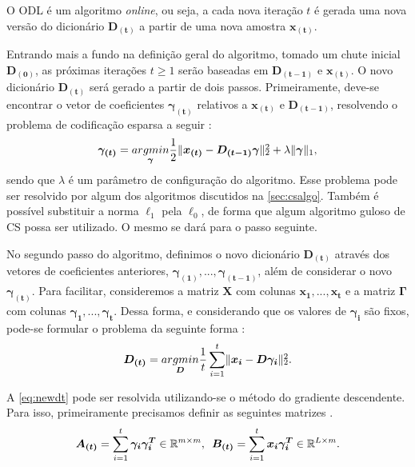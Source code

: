 \documentclass[cic,tc]{iiufrgs}
\def\SPSB#1#2{\rlap{\textsuperscript{#1}}\SB{#2}}
\def\SB#1{\textsubscript{#1}}
\renewcommand{\vec}[1]{\bm{#1}}
\newcommand{\mat}[1]{\bm{#1}}
\begin{document}
O ODL é um algoritmo \textit{online}, ou seja, a cada nova iteração $t$
é gerada uma nova versão do dicionário $\mat{D_{(t)}}$ a partir de uma nova amostra $\vec{x_{(t)}}$.

Entrando mais a fundo na definição geral do algoritmo, tomado um chute inicial $\mat{D_{(0)}}$, as próximas
iterações $t \ge 1$ serão baseadas em $\mat{D_{(t-1)}}$ e $\vec{x_{(t)}}$. O novo dicionário $\mat{D_{(t)}}$ será
gerado a partir de dois passos. Primeiramente, deve-se encontrar o vetor de coeficientes $\vec{\gamma_{(t)}}$
relativos a $\vec{x_{(t)}}$ e $\mat{D_{(t-1)}}$, resolvendo o problema de codificação esparsa a seguir \cite{chen2015compressed}:
\begin{equation}
    \vec{\gamma_{(t)}} = \underset{\vec{\gamma}}{argmin}
    \frac{1}{2} \lVert \vec{x_{(t)}} - \mat{D_{(t-1)}}\vec{\gamma} \rVert\SPSB{2}{2} +
    \lambda \lVert \vec{\gamma} \rVert_1,
\end{equation}
sendo que $\lambda$ é um parâmetro de configuração do algoritmo. Esse problema pode ser resolvido por algum dos 
algoritmos discutidos na \autoref{sec:csalgo}. 
Também é possível substituir a norma $\ell_1$ pela $\ell_0$,
de forma que algum algoritmo guloso de CS possa ser utilizado. O mesmo se dará para o passo seguinte.

No segundo passo do algoritmo, definimos o novo dicionário $\mat{D_{(t)}}$ através dos vetores de coeficientes
anteriores, $\vec{\gamma_{(1)}}, ..., \vec{\gamma_{(t-1)}}$, além de considerar o novo $\vec{\gamma_{(t)}}$.
Para facilitar, consideremos a matriz $\mat{X}$ com colunas $\vec{x_1},...,\vec{x_t}$ e a matriz $\mat{\Gamma}$
com colunas $\vec{\gamma_1},...,\vec{\gamma_t}$.
Dessa forma, e considerando que os valores de $\vec{\gamma_i}$ são fixos, pode-se 
formular o problema da seguinte forma \cite{chen2015compressed}:
\begin{equation}
    \label{eq:newdt}
    \mat{D_{(t)}} = \underset{\mat{D}}{argmin}
    \frac{1}{t} \sum_{i=1}^t \lVert \vec{x_i} - \mat{D}\vec{\gamma_i} \rVert\SPSB{2}{2}.
\end{equation}

A \autoref{eq:newdt} pode ser resolvida utilizando-se o método do 
gradiente descendente. Para isso, primeiramente precisamos definir 
as seguintes matrizes \cite{chen2015compressed}.
\begin{equation}
    \mat{A_{(t)}} = \sum_{i=1}^t \vec{\gamma_i}\vec{\gamma_i^T} \in \mathbb{R}^{m \times m},
    \hspace{0.5em}
    \mat{B_{(t)}} = \sum_{i=1}^t \vec{x_i}\vec{\gamma_i^T} \in \mathbb{R}^{L \times m}.
\end{equation}
\end{document}
